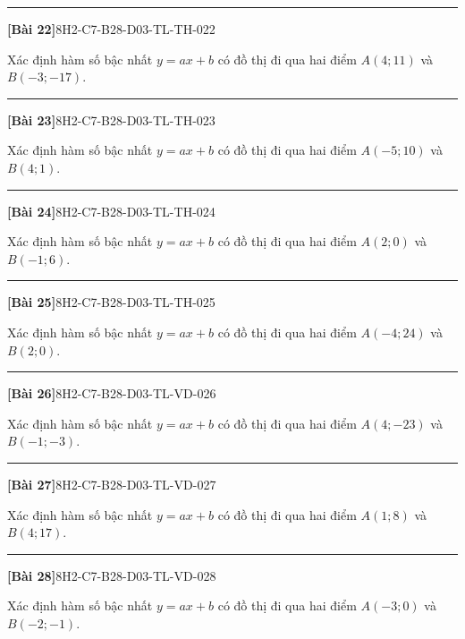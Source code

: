\documentclass[12pt,a4paper]{article}
\newif\ifloigiai
\newenvironment{cauhoi}[2]{%
  \par\medskip\noindent\rule{\textwidth}{0.4pt}\par\nopagebreak
  \noindent\textbf{[#1]}\hfill{\scriptsize\ttfamily #2}\par\nopagebreak\smallskip}{\par}
\newcommand{\loigiai}[1]{\ifloigiai\par\smallskip\noindent\textit{Lời giải.} #1\par\fi}
\begin{document}
\begin{cauhoi}{Bài 22}{8H2-C7-B28-D03-TL-TH-022}
Xác định hàm số bậc nhất $y=ax+b$ có đồ thị đi qua hai điểm $A(4;11)$ và $B(-3;-17)$.
\loigiai{Thay toạ độ $A$, $B$ vào $y=ax+b$ ta có hệ $11=4a+b$ và $-17=-3a+b$. Trừ hai vế: $a=\dfrac{11+17}{4+3}=4$. Suy ra $b=11-4\cdot(4)=-5$. Vậy $y=4x-5$.}
\end{cauhoi}
\begin{cauhoi}{Bài 23}{8H2-C7-B28-D03-TL-TH-023}
Xác định hàm số bậc nhất $y=ax+b$ có đồ thị đi qua hai điểm $A(-5;10)$ và $B(4;1)$.
\loigiai{Thay toạ độ $A$, $B$ vào $y=ax+b$ ta có hệ $10=-5a+b$ và $1=4a+b$. Trừ hai vế: $a=\dfrac{10-1}{-5-4}=-1$. Suy ra $b=10+1\cdot(-5)=5$. Vậy $y=-x+5$.}
\end{cauhoi}
\begin{cauhoi}{Bài 24}{8H2-C7-B28-D03-TL-TH-024}
Xác định hàm số bậc nhất $y=ax+b$ có đồ thị đi qua hai điểm $A(2;0)$ và $B(-1;6)$.
\loigiai{Thay toạ độ $A$, $B$ vào $y=ax+b$ ta có hệ $0=2a+b$ và $6=-a+b$. Trừ hai vế: $a=\dfrac{0-6}{2+1}=-2$. Suy ra $b=0+2\cdot(2)=4$. Vậy $y=-2x+4$.}
\end{cauhoi}
\begin{cauhoi}{Bài 25}{8H2-C7-B28-D03-TL-TH-025}
Xác định hàm số bậc nhất $y=ax+b$ có đồ thị đi qua hai điểm $A(-4;24)$ và $B(2;0)$.
\loigiai{Thay toạ độ $A$, $B$ vào $y=ax+b$ ta có hệ $24=-4a+b$ và $0=2a+b$. Trừ hai vế: $a=\dfrac{24-0}{-4-2}=-4$. Suy ra $b=24+4\cdot(-4)=8$. Vậy $y=-4x+8$.}
\end{cauhoi}
\begin{cauhoi}{Bài 26}{8H2-C7-B28-D03-TL-VD-026}
Xác định hàm số bậc nhất $y=ax+b$ có đồ thị đi qua hai điểm $A(4;-23)$ và $B(-1;-3)$.
\loigiai{Thay toạ độ $A$, $B$ vào $y=ax+b$ ta có hệ $-23=4a+b$ và $-3=-a+b$. Trừ hai vế: $a=\dfrac{-23+3}{4+1}=-4$. Suy ra $b=-23+4\cdot(4)=-7$. Vậy $y=-4x-7$.}
\end{cauhoi}
\begin{cauhoi}{Bài 27}{8H2-C7-B28-D03-TL-VD-027}
Xác định hàm số bậc nhất $y=ax+b$ có đồ thị đi qua hai điểm $A(1;8)$ và $B(4;17)$.
\loigiai{Thay toạ độ $A$, $B$ vào $y=ax+b$ ta có hệ $8=a+b$ và $17=4a+b$. Trừ hai vế: $a=\dfrac{8-17}{1-4}=3$. Suy ra $b=8-3\cdot(1)=5$. Vậy $y=3x+5$.}
\end{cauhoi}
\begin{cauhoi}{Bài 28}{8H2-C7-B28-D03-TL-VD-028}
Xác định hàm số bậc nhất $y=ax+b$ có đồ thị đi qua hai điểm $A(-3;0)$ và $B(-2;-1)$.
\loigiai{Thay toạ độ $A$, $B$ vào $y=ax+b$ ta có hệ $0=-3a+b$ và $-1=-2a+b$. Trừ hai vế: $a=\dfrac{0+1}{-3+2}=-1$. Suy ra $b=0+1\cdot(-3)=-3$. Vậy $y=-x-3$.}
\end{cauhoi}
\end{document}
